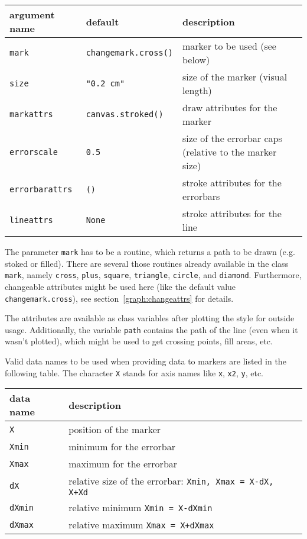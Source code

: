 \medskip
\begin{tabularx}{\linewidth}{ll>{\raggedright\arraybackslash}X}
argument name&default&description\\
\hline
\texttt{mark}&\texttt{changemark.cross()}&marker to be used (see below)\\
\texttt{size}&\texttt{"0.2 cm"}&size of the marker (visual length)\\
\texttt{markattrs}&\texttt{canvas.stroked()}&draw attributes for the marker\\
\texttt{errorscale}&\texttt{0.5}&size of the errorbar caps (relative to the marker size)\\
\texttt{errorbarattrs}&\texttt{()}&stroke attributes for the errorbars\\
\texttt{lineattrs}&\texttt{None}&stroke attributes for the line\\
\end{tabularx}
\medskip

The parameter \verb|mark| has to be a routine, which returns a path to
be drawn (e.g. stoked or filled). There are several those routines
already available in the class \verb|mark|, namely \verb|cross|,
\verb|plus|, \verb|square|, \verb|triangle|, \verb|circle|, and
\verb|diamond|. Furthermore, changeable attributes might be used here
(like the default value \verb|changemark.cross|), see
section~\ref{graph:changeattrs} for details.

The attributes are available as class variables after plotting the
style for outside usage. Additionally, the variable \verb|path|
contains the path of the line (even when it wasn't plotted), which
might be used to get crossing points, fill areas, etc.

Valid data names to be used when providing data to markers are listed
in the following table. The character \verb|X| stands for axis names
like \verb|x|, \verb|x2|, \verb|y|, etc.

\begin{center}
\begin{tabular}{ll}
data name&description\\
\hline
\texttt{X}&position of the marker\\
\texttt{Xmin}&minimum for the errorbar\\
\texttt{Xmax}&maximum for the errorbar\\
\texttt{dX}&relative size of the errorbar: \texttt{Xmin, Xmax = X-dX, X+Xd}\\
\texttt{dXmin}&relative minimum \texttt{Xmin = X-dXmin}\\
\texttt{dXmax}&relative maximum \texttt{Xmax = X+dXmax}\\
\end{tabular}
\end{center}

